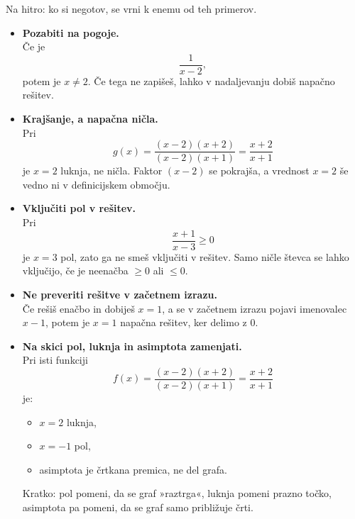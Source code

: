 \documentclass[11pt]{article}
\begin{document}
\begin{napakabox}
Na hitro: ko si negotov, se vrni k enemu od teh primerov.

\begin{itemize}[leftmargin=*]
  \item \textbf{Pozabiti na pogoje.} \\
    Če je
    \[
      \frac{1}{x-2},
    \]
    potem je $x\ne 2$. Če tega ne zapišeš, lahko v nadaljevanju dobiš napačno rešitev.

  \item \textbf{Krajšanje, a napačna ničla.} \\
    Pri
    \[
      g(x)=\frac{(x-2)(x+2)}{(x-2)(x+1)}=\frac{x+2}{x+1}
    \]
    je $x=2$ luknja, ne ničla. Faktor $(x-2)$ se pokrajša, a vrednost $x=2$ še vedno ni v definicijskem območju.

  \item \textbf{Vključiti pol v rešitev.} \\
    Pri
    \[
      \frac{x+1}{x-3}\ge 0
    \]
    je $x=3$ pol, zato ga ne smeš vključiti v rešitev. Samo ničle števca se lahko vključijo, če je neenačba $\ge 0$ ali $\le 0$.

  \item \textbf{Ne preveriti rešitve v začetnem izrazu.} \\
    Če rešiš enačbo in dobiješ $x=1$, a se v začetnem izrazu pojavi imenovalec $x-1$, potem je $x=1$ napačna rešitev, ker delimo z $0$.

  \item \textbf{Na skici pol, luknja in asimptota zamenjati.} \\
    Pri isti funkciji
    \[
      f(x)=\frac{(x-2)(x+2)}{(x-2)(x+1)}=\frac{x+2}{x+1}
    \]
    je:
    \begin{itemize}
      \item $x=2$ luknja,
      \item $x=-1$ pol,
      \item asimptota je črtkana premica, ne del grafa.
    \end{itemize}
    Kratko: pol pomeni, da se graf »raztrga«, luknja pomeni prazno točko, asimptota pa pomeni, da se graf samo približuje črti.
\end{itemize}
\end{napakabox}
\end{document}
